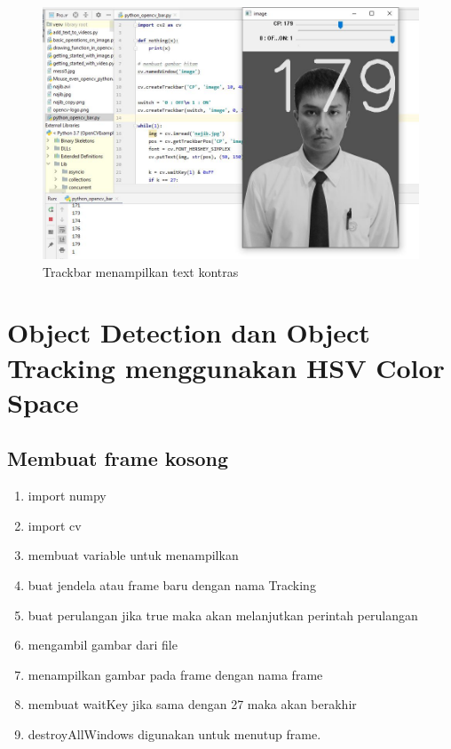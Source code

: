 \newpage
\begin{figure}[ht]
\centering
\includegraphics[scale=0.5]{figures/2,33,2.jpg}
\caption{Trackbar menampilkan text kontras}
\label{contoh}
\end{figure}



\newpage
\section{Object Detection dan Object Tracking menggunakan HSV Color Space}
\subsection{Membuat frame kosong}

\begin{enumerate}
	\item import numpy
	\item import cv
	\item membuat variable untuk menampilkan
	\item buat jendela atau frame baru dengan nama Tracking
	\item buat perulangan jika true maka akan melanjutkan perintah perulangan
	\item mengambil gambar dari file
	\item menampilkan gambar pada frame dengan nama frame
	\item membuat waitKey jika sama dengan 27 maka akan berakhir
	\item destroyAllWindows digunakan untuk menutup frame.
\end{enumerate}

